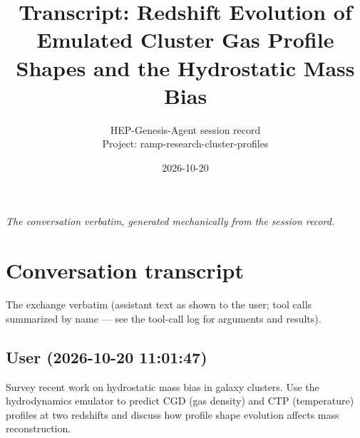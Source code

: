 \documentclass[11pt,a4paper]{article}
\title{Transcript: Redshift Evolution of Emulated Cluster Gas Profile Shapes and the Hydrostatic Mass Bias}
\author{HEP-Genesis-Agent session record \\ \small Project: ramp-research-cluster-profiles}
\date{2026-10-20}
\begin{document}
\maketitle
\noindent\textit{\small The conversation verbatim, generated mechanically from the session record.}
\vspace{1em}



\appendix
\section{Conversation transcript}
\label{app:transcript}
The exchange verbatim (assistant text as shown to the user; tool calls summarized by name --- see the tool-call log for arguments and results).
\subsection*{User \small(2026-10-20 11:01:47)}
Survey recent work on hydrostatic mass bias in galaxy clusters. Use the hydrodynamics emulator to predict CGD (gas density) and CTP (temperature) profiles at two redshifts and discuss how profile shape evolution affects mass reconstruction.
\end{document}
